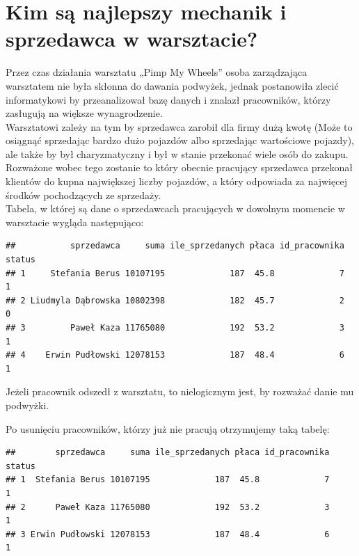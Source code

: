 \documentclass{article}\usepackage[]{graphicx}\usepackage[]{xcolor}
\makeatletter
\newenvironment{kframe}{%
 \def\at@end@of@kframe{}%
 \ifinner\ifhmode%
  \def\at@end@of@kframe{\end{minipage}}%
  \begin{minipage}{\columnwidth}%
 \fi\fi%
 \def\FrameCommand##1{\hskip\@totalleftmargin \hskip-\fboxsep
 \colorbox{shadecolor}{##1}\hskip-\fboxsep
     \hskip-\linewidth \hskip-\@totalleftmargin \hskip\columnwidth}%
 \MakeFramed {\advance\hsize-\width
   \@totalleftmargin\z@ \linewidth\hsize
   \@setminipage}}%
 {\par\unskip\endMakeFramed%
 \at@end@of@kframe}
\newenvironment{knitrout}{}{} %
\makeatother
\begin{document}
\section{Kim są najlepszy mechanik i sprzedawca w warsztacie?}

Przez czas działania warsztatu „Pimp My Wheels” osoba zarządzająca warsztatem nie była skłonna do dawania podwyżek, jednak postanowiła zlecić informatykowi by przeanalizował bazę danych i znalazł pracowników, którzy zasługują na większe wynagrodzenie. \\

Warsztatowi zależy na tym by sprzedawca zarobił dla firmy dużą kwotę (Może to osiągnąć sprzedając bardzo dużo pojazdów albo sprzedając wartościowe pojazdy), ale także by był charyzmatyczny i był w stanie przekonać wiele osób do zakupu. Rozważone wobec tego zostanie to który obecnie pracujący sprzedawca przekonał klientów do kupna największej liczby pojazdów, a który odpowiada za najwięcej środków pochodzących ze sprzedaży. \\


Tabela, w której są dane o sprzedawcach  pracujących w dowolnym momencie w warsztacie wygląda następująco:

\begin{knitrout}
\color{fgcolor}\begin{kframe}
\begin{verbatim}
##           sprzedawca     suma ile_sprzedanych płaca id_pracownika status
## 1     Stefania Berus 10107195             187  45.8             7      1
## 2 Liudmyla Dąbrowska 10802398             182  45.7             2      0
## 3         Paweł Kaza 11765080             192  53.2             3      1
## 4    Erwin Pudłowski 12078153             187  48.4             6      1
\end{verbatim}
\end{kframe}
\end{knitrout}

Jeżeli pracownik odszedł z warsztatu, to nielogicznym jest, by rozważać danie mu podwyżki.

Po usunięciu pracowników, którzy już nie pracują otrzymujemy taką tabelę:

\begin{knitrout}
\color{fgcolor}\begin{kframe}
\begin{verbatim}
##        sprzedawca     suma ile_sprzedanych płaca id_pracownika status
## 1  Stefania Berus 10107195             187  45.8             7      1
## 2      Paweł Kaza 11765080             192  53.2             3      1
## 3 Erwin Pudłowski 12078153             187  48.4             6      1
\end{verbatim}
\end{kframe}
\end{knitrout}
\end{document}
